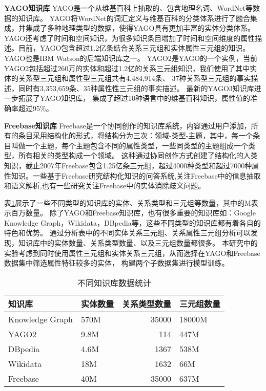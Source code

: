 \textbf{YAGO知识库} YAGO\cite{Suchanek2007YagoAC}是一个从维基百科上抽取的、包含地理名词、WordNet\cite{Kasneci2008TheYA}等数据的知识库。
YAGO将WordNet的词汇定义与维基百科的分类体系进行了融合集成\cite{Suchanek2008YAGOAL}，并集成了多种地理类型的数据，使得YAGO具有更加丰富的实体分类体系。YAGO还考虑了时间和空间知识\cite{Hoffart2011YAGO2EA}，为很多知识条目增加了时间和空间维度的属性描述。目前，YAGO包含超过1.2亿条结合关系三元组和实体属性三元组的知识。YAGO也是IBM Watson\cite{Ferrucci2010BuildingWA}的后端知识库之一。
YAGO2\cite{Hoffart2013YAGO2AS}是YAGO的一个实例，当前YAGO2包括超过260万的实体和超过1.2亿的关系三元组知识，我们使用了其中实体的关系型三元组和属性型三元组共有4,484,914条、
37种关系型三元组的事实描述，同时有3,353,659条、35种属性性三元组的事实描述。
最新的YAGO3知识库\cite{Mahdisoltani2015YAGO3AK}进一步拓展了YAGO知识库，
集成了超过10种语言中的维基百科知识，属性值的准确率超过95\%。

\textbf{Freebase知识库} Freebase\cite{Bollacker2008FreebaseAC}是一个协同创作的知识库系统，内容通过用户添加，所有的条目采用结构化的形式，将结构分为三次：领域-类型-主题，其中，每一个条目叫做一个主题，每个主题包含不同的属性类型，一些同类型的主题组成一个类型，所有相关的类型构成一个领域。
这种通过协同创作方式创建了结构化的人类知识，截止2007年Freebase包含1.25亿条三元组，超过4000种类型和超过7000种属性知识。一些基于Freebase研究结构化知识的问答系统\cite{Yao2014InformationEO}\cite{Yao2015LeanQA},关注Freebase中的信息抽取和语义解析\cite{Yao2014FreebaseQI},也有一些研究关注Freebase中的实体消除歧义问题\cite{Zheng2012EntityDW}。

表\ref{tab:addlabel-kb-list}展示了一些不同类型的知识库的实体、关系类型和三元组等数量，其中的M表示百万数量。
除了YAGO和Freebase知识库，也有很多重要的知识库如：Google Knowledge Graph，Wikidata，DBpedia等，这些不同类型的知识库都有着各自的特色和优势。
通过分析表中的不同实体关系三元组、关系属性三元组分析可以发现，知识库中的实体数量、关系类型数量、以及三元组数量都很多。
本研究中的实验考虑到同时使用属性三元组和实体关系三元组，从而选择在YAGO和Freebase数据集中筛选属性特征较多的实体，
构建两个子数据集进行模型训练。

\begin{table}[htbp]
  \centering
  \caption{不同知识库数据统计}
    \begin{tabular}{|l|l|r|l|}
    \hline
    知识库   & 实体数量  & \multicolumn{1}{l|}{关系类型数量} & 三元组数量 \\
    \hline
    Knowledge Graph & 570M  & 35000 & 18000M \\
    \hline
    YAGO2 & 9.8M  & 114   & 447M \\
    \hline
    DBpedia & 4.6M  & 1367  & 538M \\
    \hline
    Wikidata & 18M   & 1632  & 66M \\
    \hline
    Freebase & 40M   & 35000 & 637M \\
    \hline
    \end{tabular}%
  \label{tab:addlabel-kb-list}%
\end{table}%


